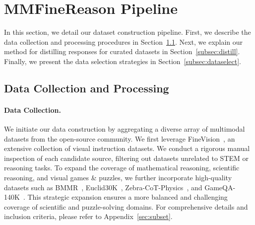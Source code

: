 \section{MMFineReason Pipeline}
In this section, we detail our dataset construction pipeline. First, we describe the data collection and processing procedures in Section~\ref{subsec:datacollect}. Next, we explain our method for distilling responses for curated datasets in Section~\ref{subsec:distill}. Finally, we present the data selection strategies in Section~\ref{subsec:dataselect}.

\subsection{Data Collection and Processing}\label{subsec:datacollect}
\paragraph{Data Collection.}

We initiate our data construction by aggregating a diverse array of multimodal datasets from the open-source community. We first leverage FineVision~\cite{finevision}, an extensive collection of visual instruction datasets. We conduct a rigorous manual inspection of each candidate source, filtering out datasets unrelated to STEM or reasoning tasks. To expand the coverage of mathematical reasoning, scientific reasoning, and visual games \& puzzles, we further incorporate high-quality datasets such as BMMR~\cite{bmmr}, Euclid30K~\cite{euclid}, Zebra-CoT-Physics~\cite{zebracot}, and GameQA-140K~\cite{gameqa}. This strategic expansion ensures a more balanced and challenging coverage of scientific and puzzle-solving domains. For comprehensive details and inclusion criteria, please refer to Appendix~\ref{sec:subset}.


